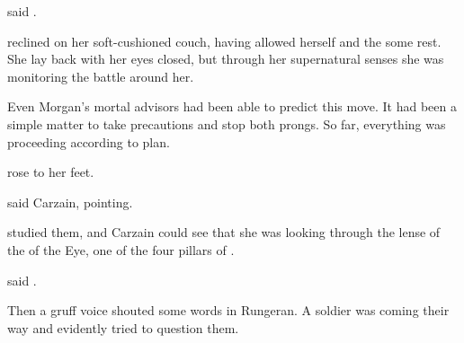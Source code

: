  said \Sanyor.





\begin{comment}
  \subsection{\Takestsha strikes back}
\end{comment}
\Takestsha reclined on her soft-cushioned couch, having allowed herself and the \ishrah some rest. 
She lay back with her eyes closed, but through her supernatural senses she was monitoring the battle around her. 

Even Morgan's mortal advisors had been able to predict this move. 
It had been a simple matter to take precautions and stop both prongs. 
So far, everything was proceeding according to plan. 


\Takestsha rose to her feet. 






\begin{comment}
  \subsection{Carzain tricks a soldier}
\end{comment}
 said Carzain, pointing. 

\Sanyor studied them, and Carzain could see that she was looking through the lense of the \sephiroth of \Mor\dash the Eye, one of the four pillars of \iquin. 

 said \Sanyor. 

Then a gruff voice shouted some words in Rungeran. 
A soldier was coming their way and evidently tried to question them. 

